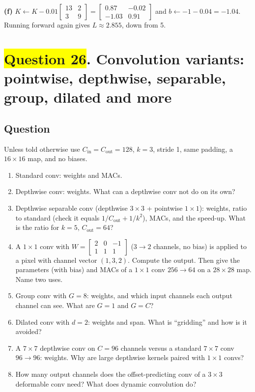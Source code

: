 \documentclass[12pt,a4paper]{article}
\newcommand{\hlq}[1]{{\setlength{\fboxsep}{1.5pt}\colorbox{yellow}{#1}}}
\begin{document}
\textbf{(f)} $K\leftarrow K-0.01\begin{bmatrix}13&2\\3&9\end{bmatrix}=\begin{bmatrix}0.87&-0.02\\-1.03&0.91\end{bmatrix}$ and $b\leftarrow-1-0.04=-1.04$. Running forward again gives $L\approx2.855$, down from 5.

\section[Question 26. Convolution variants: pointwise, depthwise, separable, group, dilated and more]{\hlq{Question 26}. Convolution variants: pointwise, depthwise, separable, group, dilated and more}
\subsection*{Question}
Unless told otherwise use $C_{\text{in}}=C_{\text{out}}=128$, $k=3$, stride 1, same padding, a $16\times16$ map, and no biases.
\begin{enumerate}[label=(\alph*)]
\item Standard conv: weights and MACs.
\item Depthwise conv: weights. What can a depthwise conv not do on its own?
\item Depthwise separable conv (depthwise $3\times3$ + pointwise $1\times1$): weights, ratio to standard (check it equals $1/C_{\text{out}}+1/k^2$), MACs, and the speed-up. What is the ratio for $k=5$, $C_{\text{out}}=64$?
\item A $1\times1$ conv with $W=\begin{bmatrix}2&0&-1\\1&1&1\end{bmatrix}$ ($3\to2$ channels, no bias) is applied to a pixel with channel vector $(1,3,2)$. Compute the output. Then give the parameters (with bias) and MACs of a $1\times1$ conv $256\to64$ on a $28\times28$ map. Name two uses.
\item Group conv with $G=8$: weights, and which input channels each output channel can see. What are $G=1$ and $G=C$?
\item Dilated conv with $d=2$: weights and span. What is ``gridding'' and how is it avoided?
\item A $7\times7$ depthwise conv on $C=96$ channels versus a standard $7\times7$ conv $96\to96$: weights. Why are large depthwise kernels paired with $1\times1$ convs?
\item How many output channels does the offset-predicting conv of a $3\times3$ deformable conv need? What does dynamic convolution do?
\end{enumerate}
\end{document}
